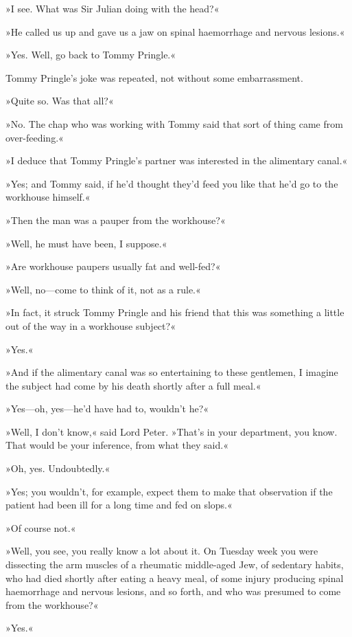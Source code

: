 »I see. What was Sir Julian doing with the head?«

»He called us up and gave us a jaw on spinal haemorrhage and nervous lesions.«

»Yes. Well, go back to Tommy Pringle.«

Tommy Pringle's joke was repeated, not without some embarrassment.

»Quite so. Was that all?«

»No. The chap who was working with Tommy said that sort of thing came from over-feeding.«

»I deduce that Tommy Pringle's partner was interested in the alimentary canal.«

»Yes; and Tommy said, if he'd thought they'd feed you like that he'd go to the workhouse himself.«

»Then the man was a pauper from the workhouse?«

»Well, he must have been, I suppose.«

»Are workhouse paupers usually fat and well-fed?«

»Well, no\allowbreak---\allowbreak come to think of it, not as a rule.«

»In fact, it struck Tommy Pringle and his friend that this was something a little out of the way in a workhouse subject?«

»Yes.«

»And if the alimentary canal was so entertaining to these gentlemen, I imagine the subject had come by his death shortly after a full meal.«

»Yes\allowbreak---\allowbreak oh, yes\allowbreak---\allowbreak he'd have had to, wouldn't he?«

»Well, I don't know,« said Lord Peter. »That's in your department, you know. That would be your inference, from what they said.«

»Oh, yes. Undoubtedly.«

»Yes; you wouldn't, for example, expect them to make that observation if the patient had been ill for a long time and fed on slops.«

»Of course not.«

»Well, you see, you really know a lot about it. On Tuesday week you were dissecting the arm muscles of a rheumatic middle-aged Jew, of sedentary habits, who had died shortly after eating a heavy meal, of some injury producing spinal haemorrhage and nervous lesions, and so forth, and who was presumed to come from the workhouse?«

»Yes.«

